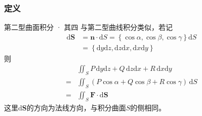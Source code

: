 \documentclass[xetex]{beamer}
\begin{document}
    \begin{frame}
        \frametitle{定义}
    
        \begin{block}{第二型曲面积分 · 其四}
            与第二型曲线积分类似，若记
            $$\begin{aligned}
                \mathrm{d}\mathbf{S} &= \mathbf{n}\cdot\mathrm{d}S=\left\{\cos\alpha,\cos\beta,\cos\gamma\right\}\mathrm{d}S \\
                &= \left\{\mathrm{d}y\mathrm{d}z,\mathrm{d}z\mathrm{d}x,\mathrm{d}x\mathrm{d}y\right\}
            \end{aligned}$$
            则
            $$\begin{aligned}
                & \iint_SP\,\mathrm{d}y\mathrm{d}z+Q\,\mathrm{d}z\mathrm{d}x+R\,\mathrm{d}x\mathrm{d}y \\
                = & \iint_S(P\cos\alpha+Q\cos\beta+R\cos\gamma)\,\mathrm{d}S \\
                = & \iint_S\mathbf{F}\cdot\mathrm{d}\mathbf{S}
            \end{aligned}$$
            这里$\mathrm{d}\mathbf{S}$的方向为法线方向，与积分曲面$S$的侧相同。
        \end{block}
    
    \end{frame}
\end{document}

